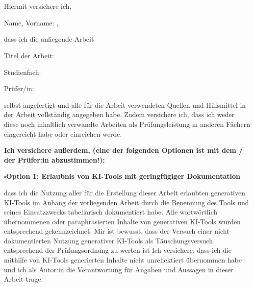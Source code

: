 %
%
%
%

\chapter*{\chapHeadingDeclaration}

\fontsize{9}{10}\selectfont

\vspace{1\baselineskip}

Hiermit versichere ich,

\noindent
Name, Vorname:
\underline{\hspace{0.82\textwidth}},

\noindent

dass ich die anliegende Arbeit

\noindent
Titel der Arbeit:
\underline{\hspace{0.83\textwidth}}

\noindent
Studienfach:
\underline{\hspace{0.85\textwidth}}

\noindent
Prüfer/in:
\underline{\hspace{0.89\textwidth}}

\vspace{0.25\baselineskip}

\noindent
selbst angefertigt und alle für die Arbeit verwendeten Quellen und Hilfsmittel in der Arbeit vollständig angegeben habe.
Zudem versichere ich, dass ich weder diese noch inhaltlich verwandte Arbeiten als Prüfungsleistung in anderen Fächern eingereicht habe oder einreichen werde.

\noindent
\textbf{Ich versichere außerdem, (eine der folgenden Optionen ist mit dem / der Prüfer:in abzustimmen!):}

\noindent
$\square$\hspace{1em}\textbf{Option 1: Erlaubnis von KI-Tools mit geringfügiger Dokumentation}

\smallskip

\noindent
dass ich die Nutzung aller für die Erstellung dieser Arbeit erlaubten generativen KI-Tools im Anhang der vorliegenden Arbeit durch die Benennung des Tools und seines Einsatzzwecks tabellarisch dokumentiert habe.
Alle wortwörtlich übernommenen oder paraphrasierten Inhalte von generativen KI-Tools wurden entsprechend gekennzeichnet.
Mir ist bewusst, dass der Versuch einer nicht-dokumentierten Nutzung generativer KI-Tools als Täuschungsversuch entsprechend der Prüfungsordnung zu werten ist
Ich versichere, dass ich die mithilfe von KI-Tools generierten Inhalte nicht unreflektiert übernommen habe und ich als Autor:in die Verantwortung für Angaben und Aussagen in dieser Arbeit trage.

